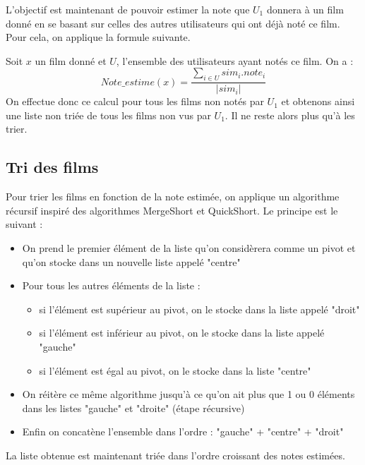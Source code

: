L'objectif est maintenant de pouvoir estimer la note que $U_1$ donnera à un film donné en se basant sur celles des autres utilisateurs qui ont déjà noté ce film. Pour cela, on applique la formule suivante.\par
Soit $x$ un film donné et $U$, l'ensemble des utilisateurs ayant notés ce film. On a :
$$Note\_estime(x) = \frac{\sum_{i\in{U}} sim_i.note_i}{|sim_i|}$$
On effectue donc ce calcul pour tous les films non notés par $U_{1}$ et obtenons ainsi une liste non triée de tous les films non vus par $U_{1}$. Il ne reste alors plus qu'à les trier.

\subsection{Tri des films}
Pour trier les films en fonction de la note estimée, on applique un algorithme récursif inspiré des algorithmes MergeShort et QuickShort. Le principe est le suivant :
\begin{itemize}
	\item On prend le premier élément de la liste qu'on considèrera comme un pivot et qu'on stocke dans un nouvelle liste appelé "centre"
	\item Pour tous les autres éléments de la liste :
	\begin{itemize}
		\item si l'élément est supérieur au pivot, on le stocke dans la liste appelé "droit"
		\item si l'élément est inférieur au pivot, on le stocke dans la liste appelé "gauche"
		\item si l'élément est égal au pivot, on le stocke dans la liste "centre"
	\end{itemize}
	\item On réitère ce même algorithme jusqu'à ce qu'on ait plus que 1 ou 0 éléments dans les listes "gauche" et "droite" (étape récursive)
	\item Enfin on concatène l'ensemble dans l'ordre : "gauche" + "centre" + "droit"
\end{itemize}
La liste obtenue est maintenant triée dans l'ordre croissant des notes estimées.
